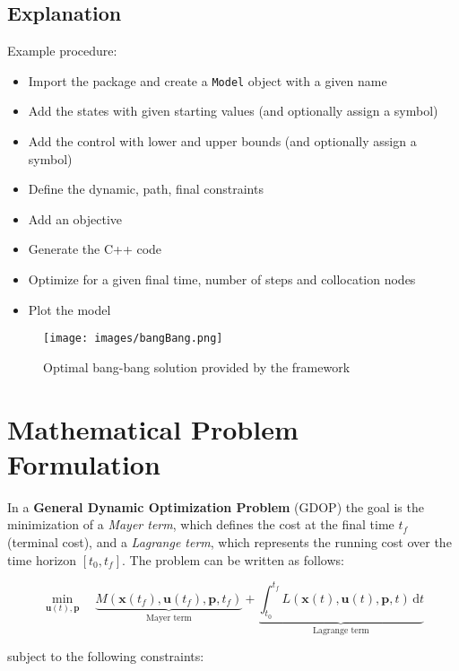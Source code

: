\documentclass[12pt]{article}
\newcommand{\dd}{\mathrm{d}}
\renewcommand{\v}{\bm}
\begin{document}
\subsection{Explanation}
Example procedure:
\begin{itemize}
	\item Import the package and create a \texttt{Model} object
	      with a given name
	\item Add the states with given starting values (and optionally
	      assign a symbol)
	\item Add the control with lower and upper bounds (and
	      optionally assign a symbol)
	\item Define the dynamic, path, final constraints
	\item Add an objective
	\item Generate the C++ code
	\item Optimize for a given final time, number of steps and
	      collocation nodes
	\item Plot the model
\end{itemize}

\begin{figure}[H]
	\centering
	\texttt{[image: images/bangBang.png]}
	\caption{Optimal bang-bang solution provided by the framework}
	\label{fig:bangBang}
\end{figure}
\section{Mathematical Problem Formulation}
\label{c:GDOP}

In a \textbf{General Dynamic Optimization Problem} (GDOP) the goal is the
minimization of a \textit{Mayer term}, which defines the cost at the final time
$t_f$ (terminal cost), and a \textit{Lagrange term}, which represents the
running cost over the time horizon $[t_0, t_f]$. The problem can be written as
follows:

\begin{equation*}
	\min_{\v{u}(t), \v{p}} \quad \underbrace{M(\v{x}(t_f), \v{u}(t_f),
		\v{p}, t_f)}_{\text{Mayer term}} + \underbrace{\int_{t_0}^{t_f} L(\v{x}(t),
		\v{u}(t), \v{p}, t)\, \dd t}_{\text{Lagrange term}}
\end{equation*}

subject to the following constraints:
\end{document}
